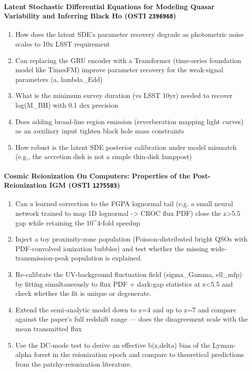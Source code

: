 \paragraph{Latent Stochastic Differential Equations for Modeling Quasar Variability and Inferring Black Ho \textnormal{\small(OSTI \texttt{2396968})}}
\begin{enumerate}[leftmargin=1.6em,itemsep=0.2em,topsep=0.2em,label=Q\arabic*.]
\item How does the latent SDE's parameter recovery degrade as photometric noise scales to 10x LSST requirement
\item Can replacing the GRU encoder with a Transformer (time-series foundation model like TimesFM) improve parameter recovery for the weak-signal parameters (a, lambda\_Edd)
\item What is the minimum survey duration (vs LSST 10yr) needed to recover log(M\_BH) with 0.1 dex precision
\item Does adding broad-line region emission (reverberation mapping light curves) as an auxiliary input tighten black hole mass constraints
\item How robust is the latent SDE posterior calibration under model mismatch (e.g., the accretion disk is not a simple thin-disk lamppost)
\end{enumerate}
\paragraph{Cosmic Reionization On Computers: Properties of the Post-Reionization IGM \textnormal{\small(OSTI \texttt{1275503})}}
\begin{enumerate}[leftmargin=1.6em,itemsep=0.2em,topsep=0.2em,label=Q\arabic*.]
\item Can a learned correction to the FGPA lognormal tail (e.g. a small neural network trained to map 1D lognormal -\textgreater{} CROC flux PDF) close the z\textgreater{}5.5 gap while retaining the 10\textasciicircum{}4-fold speedup
\item Inject a toy proximity-zone population (Poisson-distributed bright QSOs with PDF-convolved ionization bubbles) and test whether the missing wide-transmission-peak population is explained.
\item Re-calibrate the UV-background fluctuation field (sigma\_Gamma, ell\_mfp) by fitting simultaneously to flux PDF + dark-gap statistics at z\textless{}5.5 and check whether the fit is unique or degenerate.
\item Extend the semi-analytic model down to z=4 and up to z=7 and compare against the paper's full redshift range --- does the disagreement scale with the mean transmitted flux
\item Use the DC-mode test to derive an effective b(z,delta) bias of the Lyman-alpha forest in the reionization epoch and compare to theoretical predictions from the patchy-reionization literature.
\end{enumerate}
